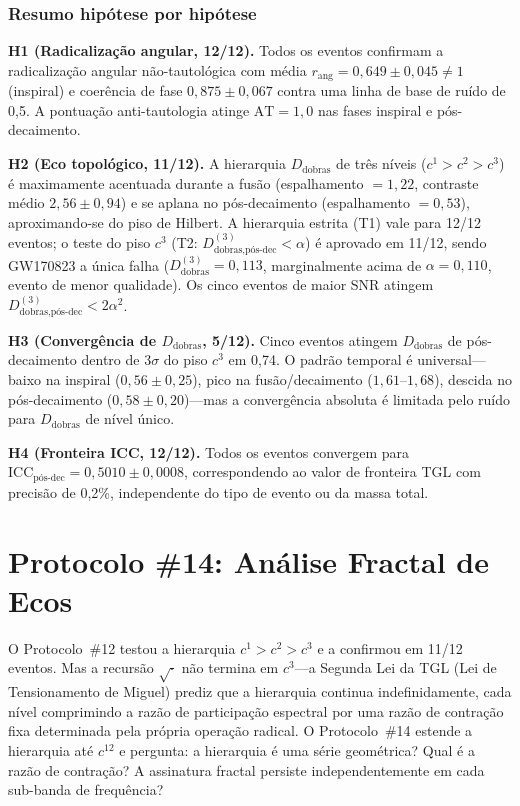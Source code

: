 \documentclass[12pt,a4paper,twocolumn]{article}
\newcommand{\alphaii}{\alpha^{2}}
\newcommand{\Dfolds}{D_{\text{dobras}}}
\newcommand{\CCI}{\text{ICC}}
\begin{document}
\subsubsection{Resumo hipótese por hipótese}

\textbf{H1 (Radicalização angular, 12/12).} Todos os eventos confirmam a radicalização angular não-tautológica com média $r_{\text{ang}} = 0{,}649 \pm 0{,}045 \neq 1$ (inspiral) e coerência de fase $0{,}875 \pm 0{,}067$ contra uma linha de base de ruído de 0{,}5. A pontuação anti-tautologia atinge $\text{AT} = 1{,}0$ nas fases inspiral e pós-decaimento.

\textbf{H2 (Eco topológico, 11/12).} A hierarquia $\Dfolds$ de três níveis ($c^1 > c^2 > c^3$) é maximamente acentuada durante a fusão (espalhamento $= 1{,}22$, contraste médio $2{,}56 \pm 0{,}94$) e se aplana no pós-decaimento (espalhamento $= 0{,}53$), aproximando-se do piso de Hilbert. A hierarquia estrita (T1) vale para 12/12 eventos; o teste do piso $c^3$ (T2: $D_{\text{dobras,pós-dec}}^{(3)} < \alpha$) é aprovado em 11/12, sendo GW170823 a única falha ($\Dfolds^{(3)} = 0{,}113$, marginalmente acima de $\alpha = 0{,}110$, evento de menor qualidade). Os cinco eventos de maior SNR atingem $D_{\text{dobras,pós-dec}}^{(3)} < 2\alphaii$.

\textbf{H3 (Convergência de $\Dfolds$, 5/12).} Cinco eventos atingem $\Dfolds$ de pós-decaimento dentro de $3\sigma$ do piso $c^3$ em 0{,}74. O padrão temporal é universal---baixo na inspiral ($0{,}56 \pm 0{,}25$), pico na fusão/decaimento ($1{,}61$--$1{,}68$), descida no pós-decaimento ($0{,}58 \pm 0{,}20$)---mas a convergência absoluta é limitada pelo ruído para $\Dfolds$ de nível único.

\textbf{H4 (Fronteira ICC, 12/12).} Todos os eventos convergem para $\CCI_{\text{pós-dec}} = 0{,}5010 \pm 0{,}0008$, correspondendo ao valor de fronteira TGL com precisão de 0{,}2\%, independente do tipo de evento ou da massa total.



\section{Protocolo \#14: Análise Fractal de Ecos}
\label{sec:protocol14}

O Protocolo~\#12 testou a hierarquia $c^1 > c^2 > c^3$ e a confirmou em 11/12 eventos. Mas a recursão $\sqrt{\cdot}$ não termina em $c^3$---a Segunda Lei da TGL (Lei de Tensionamento de Miguel) prediz que a hierarquia continua indefinidamente, cada nível comprimindo a razão de participação espectral por uma razão de contração fixa determinada pela própria operação radical. O Protocolo~\#14 estende a hierarquia até $c^{12}$ e pergunta: a hierarquia é uma série geométrica? Qual é a razão de contração? A assinatura fractal persiste independentemente em cada sub-banda de frequência?
\end{document}
